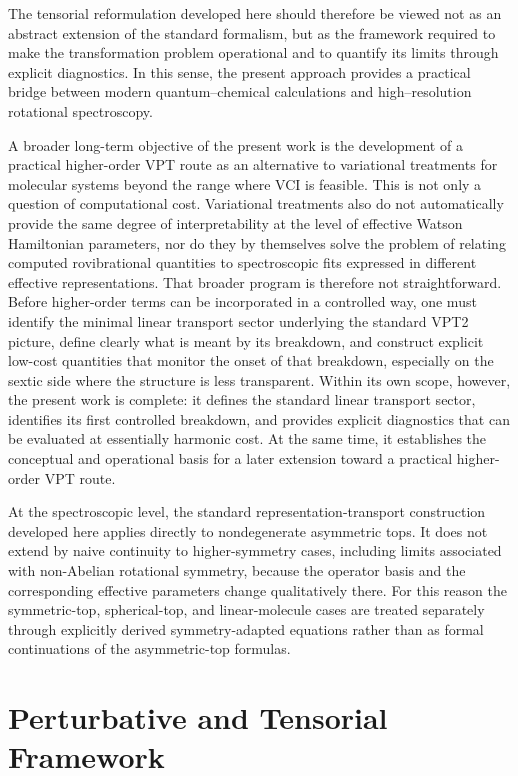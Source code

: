 \documentclass[aip,jcp,reprint,floatfix]{revtex4-2}
\begin{document}
The tensorial reformulation developed here should therefore be viewed
not as an abstract extension of the standard formalism, but as the
framework required to make the transformation problem operational and to
quantify its limits through explicit diagnostics. In this sense, the
present approach provides a practical bridge between modern
quantum--chemical calculations and high--resolution rotational
spectroscopy.

A broader long-term objective of the present work is the development
of a practical higher-order VPT route as an alternative to variational
treatments for molecular systems beyond the range where VCI is feasible.
This is not only a question of computational cost. Variational
treatments also do not automatically provide the same degree of
interpretability at the level of effective Watson Hamiltonian
parameters, nor do they by themselves solve the problem of relating
computed rovibrational quantities to spectroscopic fits expressed in
different effective representations. That broader program is therefore
not straightforward. Before higher-order terms can be incorporated in a
controlled way, one must identify the minimal linear transport sector
underlying the standard VPT2 picture, define clearly what is meant by
its breakdown, and construct explicit low-cost quantities that monitor
the onset of that breakdown, especially on the sextic side where the
structure is less transparent. Within its own scope, however, the
present work is complete: it defines the standard linear transport
sector, identifies its first controlled breakdown, and provides
explicit diagnostics that can be evaluated at essentially harmonic
cost. At the same time, it establishes the conceptual and operational
basis for a later extension toward a practical higher-order VPT route.

At the spectroscopic level, the standard representation-transport
construction developed here applies directly to nondegenerate asymmetric
tops. It does not extend by naive continuity to higher-symmetry cases,
including limits associated with non-Abelian rotational symmetry,
because the operator basis and the corresponding effective parameters
change qualitatively there. For this reason the symmetric-top,
spherical-top, and linear-molecule cases are treated separately through
explicitly derived symmetry-adapted equations rather than as formal
continuations of the asymmetric-top formulas.


\section{Perturbative and Tensorial Framework}
\end{document}
